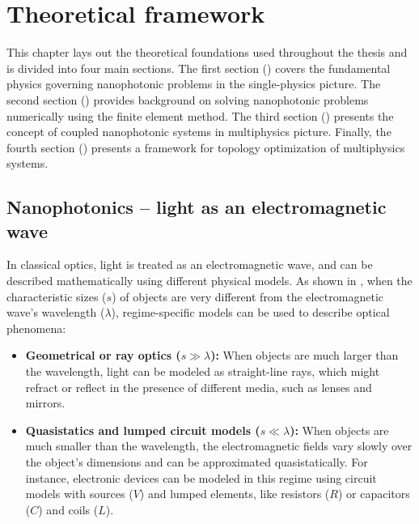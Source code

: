 \chapter{Theoretical framework}

This chapter lays out the theoretical foundations used throughout the thesis and is divided into four main sections. The first section () covers the fundamental physics governing nanophotonic problems in the single-physics picture. The second section () provides background on solving nanophotonic problems numerically using the finite element method. The third section () presents the concept of coupled nanophotonic systems in multiphysics picture. Finally, the fourth section () presents a framework for topology optimization of multiphysics systems.




\section{Nanophotonics -- light as an electromagnetic
  wave}\label{sec:nanophotonics}

  In classical optics, light is treated as an electromagnetic wave, and can be described mathematically 
  using different physical models. As shown in ,
  when the characteristic sizes ($s$) of objects are very different from the electromagnetic wave's
  wavelength ($\lambda$),
  regime-specific models can be used to describe optical phenomena:
  \begin{itemize}
      \item \textbf{Geometrical or ray optics ($s \gg \lambda$):} When objects
   are much larger than the wavelength, light can be modeled as straight-line rays,
   which might refract or reflect in the presence of different media, such as
   lenses and mirrors.
      \item \textbf{Quasistatics and lumped circuit models ($s \ll \lambda$):}
   When objects are much smaller than the wavelength, the electromagnetic fields vary slowly over the object's dimensions 
   and can be approximated quasistatically. For instance, electronic devices
   can be modeled in this regime using circuit models with sources ($V$) and lumped elements, 
   like resistors ($R$) or capacitors ($C$) and coils ($L$).
  \end{itemize}

